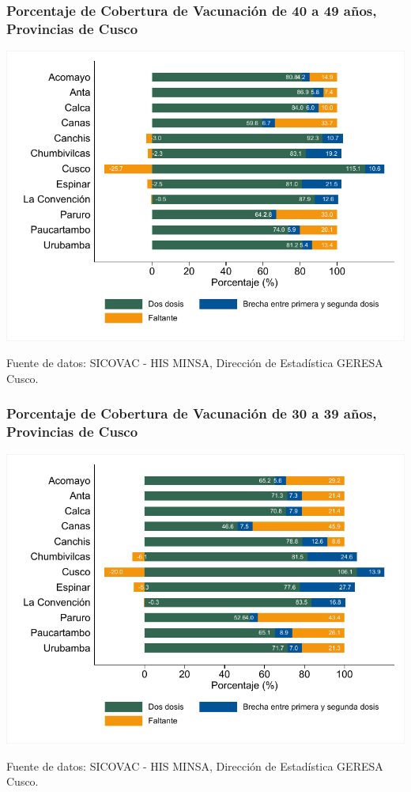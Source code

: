 \documentclass[xcolor=table]{beamer}
\begin{document}
\begin{frame}[label=vacunas_50]
	\frametitle{Porcentaje de Cobertura de Vacunación de 40 a 49 años, Provincias de Cusco}
	\vspace{-.5cm}
	\begin{center}
		\includegraphics[width=0.8\linewidth, trim={.2cm .5cm .2cm .2cm},clip]{../figuras/vacunacion_provincial_edad_5.pdf}
	\end{center}
	{\tiny Fuente de datos: SICOVAC - HIS MINSA, Dirección de Estadística GERESA Cusco. \\}
\hyperlink{cobertura_vacuna_provincias}{}
\end{frame}

\begin{frame}[label=vacunas_40]
	\frametitle{Porcentaje de Cobertura de Vacunación de 30 a 39 años, Provincias de Cusco}
	\vspace{-.5cm}
	\begin{center}
		\includegraphics[width=0.8\linewidth, trim={.2cm .5cm .2cm .2cm},clip]{../figuras/vacunacion_provincial_edad_4.pdf}
	\end{center}
	{\tiny Fuente de datos: SICOVAC - HIS MINSA, Dirección de Estadística GERESA Cusco. \\}
\hyperlink{cobertura_vacuna_provincias}{}
\end{frame}
\end{document}
